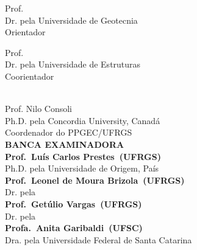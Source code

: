 \documentclass[
	12pt,				%
	openright,			%
	oneside,			%
	a4paper,			%
	chapter=TITLE,		%
	section=TITLE,		%
	english,			%
	french,				%
	spanish,			%
	brazil				%
	]{ppgec}
\newcommand{\titorientador}{Dr. pela Universidade de Geotecnia}
\newcommand{\titcoorientador}{Dr. pela Universidade de Estruturas}
\newcommand{\abrevinstituicao}{UFRGS}
\newcommand{\abrevppg}{PPGEC}
\newcommand{\coordenador}{Nilo Consoli}
\newcommand{\titcoordenador}{Ph.D. pela Concordia University, Canadá}
\newcommand{\tratbancaum}{Prof.}
\newcommand{\bancaum}{Luís Carlos Prestes}
\newcommand{\origembancaum}{UFRGS}
\newcommand{\titbancaum}{Ph.D. pela Universidade de Origem, País}
\newcommand{\tratbancadois}{Prof.}
\newcommand{\bancadois}{Leonel de Moura Brizola}
\newcommand{\origembancadois}{UFRGS}
\newcommand{\titbancadois}{Dr. pela~\imprimirinstituicao}
\newcommand{\tratbancatres}{Prof.}
\newcommand{\bancatres}{Getúlio Vargas}
\newcommand{\origembancatres}{UFRGS}
\newcommand{\titbancatres}{Dr. pela~\imprimirinstituicao}
\newcommand{\tratbancaquatro}{Profa.}
\newcommand{\bancaquatro}{Anita Garibaldi}
\newcommand{\origembancaquatro}{UFSC}
\newcommand{\titbancaquatro}{Dra. pela Universidade Federal de Santa Catarina}
\begin{document}
\begin{folhadeaprovacao}
\begin{flushright}
    \begin{minipage}{0.52\textwidth}
    \begin{flushright}
    Prof. \imprimirorientador \\ \titorientador \\ Orientador
    \vspace{7mm}
    \end{flushright}
    \end{minipage}
    \hfill
    \begin{minipage}{0.47\textwidth}
    \begin{flushright}
    Prof. \imprimircoorientador \\ \titcoorientador \\ Coorientador
    \vspace{7mm}
    \end{flushright}
    \end{minipage}
% 
    \vspace*{20pt}
    \\ Prof. \coordenador \\ \titcoordenador \\ Coordenador do \abrevppg/\abrevinstituicao
    \vspace{5mm}
    \\ \textbf{\MakeUppercase{Banca Examinadora}}
    \vspace{20pt}
    \\ \textbf{\tratbancaum~\bancaum~(\origembancaum)} \\ \titbancaum
    \vspace{20pt}
    \\ \textbf{\tratbancadois~\bancadois~(\origembancadois)} \\ \titbancadois
    \vspace{20pt}
    \\ \textbf{\tratbancatres~\bancatres~(\origembancatres)} \\ \titbancatres
    \vspace{20pt}
    \\ \textbf{\tratbancaquatro~\bancaquatro~(\origembancaquatro)} \\ \titbancaquatro

    \end{flushright}

    \vspace*{\fill}
    \vspace*{\fill}

  \end{folhadeaprovacao}
  
\end{document}
